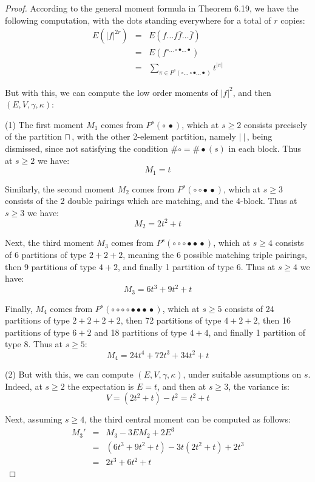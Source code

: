 \documentclass[12pt]{amsbook}
\begin{document}
\begin{proof}
According to the general moment formula in Theorem 6.19, we have the following computation, with the dots standing everywhere for a total of $r$ copies:
\begin{eqnarray*}
E(|f|^{2r})
&=&E(f\ldots f\bar{f}\ldots\bar{f})\\
&=&E(f^{\circ\ldots\circ\bullet\ldots\bullet})\\
&=&\sum_{\pi\in P^s(\circ\ldots\circ\bullet\ldots\bullet)}t^{|\pi|}
\end{eqnarray*}

But with this, we can compute the low order moments of $|f|^2$, and then $(E,V,\gamma,\kappa)$:

\medskip

(1) The first moment $M_1$ comes from $P^s(\circ\,\bullet)$, which at $s\geq2$ consists precisely of the partition $\sqcap\,$, with the other 2-element partition, namely $|\ |\,$, being dismissed, since not satisfying the condition $\#\circ=\#\bullet(s)$ in each block. Thus at $s\geq2$ we have:
$$M_1=t$$

Similarly, the second moment $M_2$ comes from $P^s(\circ\circ\bullet\,\bullet)$, which at $s\geq3$ consists of the 2 double pairings which are matching, and the 4-block. Thus at $s\geq3$ we have:
$$M_2=2t^2+t$$

Next, the third moment $M_3$ comes from $P^s(\circ\circ\circ\bullet\bullet\,\bullet)$, which at $s\geq4$ consists of 6 partitions of type $2+2+2$, meaning the 6 possible matching triple pairings, then 9 partitions of type $4+2$, and finally 1 partition of type 6. Thus at $s\geq4$ we have:
$$M_3=6t^3+9t^2+t$$

Finally, $M_4$ comes from $P^s(\circ\circ\circ\circ\bullet\bullet\bullet\,\bullet)$, which at $s\geq5$ consists of 24 partitions of type $2+2+2+2$, then 72 partitions of type $4+2+2$, then 16 partitions of type $6+2$ and 18 partitions of type $4+4$, and finally 1 partition of type 8. Thus at $s\geq5$:
$$M_4=24t^4+72t^3+34t^2+t$$

(2) But with this, we can compute $(E,V,\gamma,\kappa)$, under suitable assumptions on $s$. Indeed, at $s\geq2$ the expectation is $E=t$, and then at $s\geq3$, the variance is:
$$V=(2t^2+t)-t^2=t^2+t$$

Next, assuming $s\geq4$, the third central moment can be computed as follows:
\begin{eqnarray*}
M_3'
&=&M_3-3EM_2+2E^3\\
&=&(6t^3+9t^2+t)-3t(2t^2+t)+2t^3\\
&=&2t^3+6t^2+t
\end{eqnarray*}


\end{proof}
\end{document}

